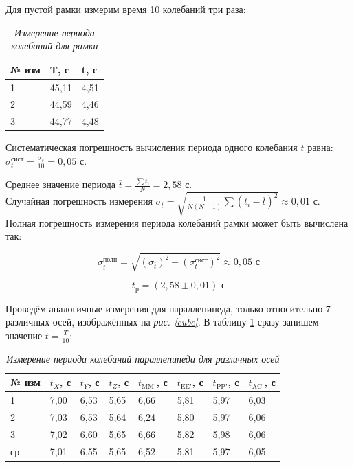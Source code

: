 \documentclass[a4paper, 12pt]{article}
\begin{document}
Для пустой рамки измерим время 10 колебаний три раза:

\begin{table}[!ht]
    \centering
    \begin{tabular}{|l|l|l|}
    \hline
        № изм & T, с & t, с \\ \hline
        1 & 45,11  & 4,51 \\ \hline
        2 & 44,59  & 4,46 \\ \hline
        3 & 44,77  & 4,48 \\ \hline
    \end{tabular}\caption{\textit{Измерение периода колебаний для рамки}}
\end{table}

Систематическая погрешность вычисления периода одного колебания $t$ равна: $\sigma_t^\text{сист} = \frac{\sigma_s}{10} = 0,05 \text{ с}$.

Среднее значение периода $ \overline{t} = \frac{\sum t_i}{N} = 2,58 \text{ с}$.\\

Случайная погрешность измерения $ \sigma_{\overline{t}} = \sqrt{\frac{1}{N  (N-1)}\sum(t_i-\overline{t})^2} \approx 0,01 \text{ с}$. \\

Полная погрешность измерения периода колебаний рамки может быть вычислена так:

\begin{equation}
    \sigma^{\text{полн}}_{\overline{t}} = \sqrt{\left( \sigma_{\overline{t}} \right)^2 + \left( \sigma_t^\text{сист} \right) ^ 2} \approx 0,05 \text{ с}
\end{equation}

\begin{equation}
    t_{\text{р}} = ( 2,58 \pm 0,01 ) \text{ с}
\end{equation}

Проведём аналогичные измерения для параллепипеда, только относительно 7 различных осей, изображённых на \textit{рис. \ref{cube}}. В таблицу \ref{almost_cube} сразу запишем значение $t = \frac{T}{10}$:

\begin{table}[!ht]
    \centering
    \begin{tabular}{|l|l|l|l|l|l|l|l|}
    \hline
        № изм & $t_X$, с & $t_Y$, с & $t_Z$, с & $t_\text{MM'}$, с & $t_\text{EE'}$, с & $t_\text{PP'}$, с & $t_\text{AC'}$, с \\ \hline
        1 & 7,00 & 6,53 & 5,65 & 6,66 & 5,81 & 5,97 & 6,03  \\ \hline
        2 & 7,03 & 6,53 & 5,64 & 6,24 & 5,80 & 5,97 & 6,06  \\ \hline
        3 & 7,02 & 6,60 & 5,65 & 6,66 & 5,82 & 5,98 & 6,06  \\ \hline
        ср & 7,01 & 6,55 & 5,65 & 6,52 & 5,81 & 5,97 & 6,05  \\ \hline
    \end{tabular}\caption{\textit{Измерение периода колебаний параллепипеда для различных осей}}\label{almost_cube}
\end{table}
\end{document}
